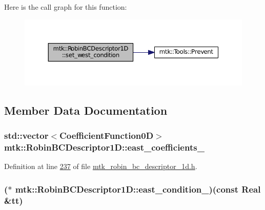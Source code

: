 Here is the call graph for this function\+:\nopagebreak
\begin{figure}[H]
\begin{center}
\leavevmode
\includegraphics[width=350pt]{classmtk_1_1RobinBCDescriptor1D_a06bfaf0126d528247c3c76fdd19f4b85_cgraph}
\end{center}
\end{figure}




\subsection{Member Data Documentation}
\hypertarget{classmtk_1_1RobinBCDescriptor1D_aa8f5350e1767174f92fda449b44d1b04}{
\subsubsection[{east\+\_\+coefficients\+\_\+}]{\setlength{\rightskip}{0pt plus 5cm}std\+::vector$<${\bf Coefficient\+Function0\+D}$>$ mtk\+::\+Robin\+B\+C\+Descriptor1\+D\+::east\+\_\+coefficients\+\_\+\hspace{0.3cm}{\ttfamily [private]}}}\label{classmtk_1_1RobinBCDescriptor1D_aa8f5350e1767174f92fda449b44d1b04}


Definition at line \hyperlink{mtk__robin__bc__descriptor__1d_8h_source_l00237}{237} of file \hyperlink{mtk__robin__bc__descriptor__1d_8h_source}{mtk\+\_\+robin\+\_\+bc\+\_\+descriptor\+\_\+1d.\+h}.

\hypertarget{classmtk_1_1RobinBCDescriptor1D_adecf9da4390869d2aa49ccb1307320d6}{
\subsubsection[{east\+\_\+condition\+\_\+}]{($\ast$ mtk\+::\+Robin\+B\+C\+Descriptor1\+D\+::east\+\_\+condition\+\_\+)(const {\bf Real} \&tt)\hspace{0.3cm}{\ttfamily [private]}}}\label{classmtk_1_1RobinBCDescriptor1D_adecf9da4390869d2aa49ccb1307320d6}



